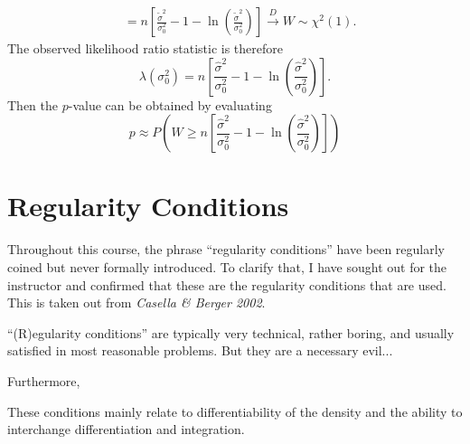 \documentclass[notoc,notitlepage]{tufte-book}
\newcommand{\convd}{\overset{D}{\to}}
\begin{document}
\begin{solution}
\begin{align*}
                        &= n \left[ \frac{\tilde{\sigma}^2}{\sigma_0^2} - 1 - \ln \left( \frac{\tilde{\sigma}^2}{\sigma_0^2} \right) \right] \convd W \sim \chi^2(1).
  \end{align*}
  The observed likelihood ratio statistic is therefore
  \begin{equation*}
    \lambda(\sigma_0^2) = n \left[ \frac{\hat{\sigma}^2}{\sigma_0^2} - 1 - \ln \left( \frac{\hat{\sigma}^2}{\sigma_0^2} \right) \right].
  \end{equation*}
  Then the $p$-value can be obtained by evaluating
  \begin{equation*}
    p \approx P\left(W \geq n \left[ \frac{\hat{\sigma}^2}{\sigma_0^2} - 1 - \ln \left( \frac{\hat{\sigma}^2}{\sigma_0^2} \right) \right]\right)
  \end{equation*}
\end{solution}




\appendix

\chapter{Regularity Conditions}%
\label{chp:regularity_conditions}

Throughout this course, the phrase ``regularity conditions'' have been regularly coined but never formally introduced. To clarify that, I have sought out for the instructor and confirmed that these are the regularity conditions that are used. This is taken out from \textit{Casella \& Berger 2002}\cite{CasellaBerger2002}.

\begin{displayquote}
  ``(R)egularity conditions'' are typically very technical, rather boring, and usually satisfied in most reasonable problems. But they are a necessary evil...
\end{displayquote}

\noindent Furthermore,

\begin{displayquote}
  These conditions mainly relate to differentiability of the density and the ability to interchange differentiation and integration.
\end{displayquote}
\end{document}
